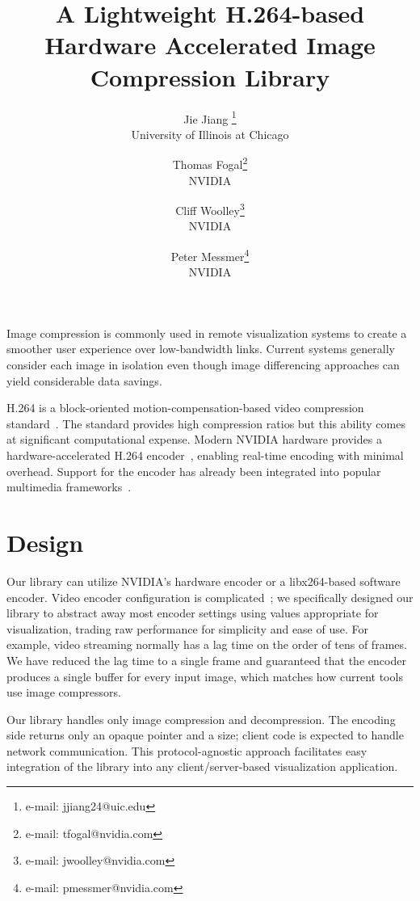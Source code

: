 \documentclass{vgtc}                          %
\title{A Lightweight H.264-based Hardware Accelerated Image Compression Library}
\author{Jie Jiang \thanks{e-mail: jjiang24@uic.edu}\\
        \scriptsize University of Illinois at Chicago
\and Thomas Fogal\thanks{e-mail: tfogal@nvidia.com}\\
     \scriptsize NVIDIA
\and Cliff Woolley\thanks{e-mail: jwoolley@nvidia.com}\\
     \scriptsize NVIDIA
\and Peter Messmer\thanks{e-mail: pmessmer@nvidia.com}\\
     \scriptsize NVIDIA}
\begin{document}


\maketitle

Image compression is commonly used in remote visualization systems to
create a smoother user experience over low-bandwidth links. Current
systems generally consider each image in isolation even though image
differencing approaches can yield considerable data savings.

H.264 is a block-oriented motion-compensation-based video compression
standard~\cite{wiegand2003overview}. The standard provides high
compression ratios but this ability comes at significant computational
expense.  Modern NVIDIA hardware provides a hardware-accelerated H.264
encoder~\cite{nvcodec}, enabling real-time encoding with
minimal overhead. Support for the encoder has already been
integrated into popular multimedia frameworks~\cite{ffmpeg}.

\section{Design}

Our library can utilize NVIDIA's hardware encoder or a libx264-based
software encoder. Video encoder configuration is
complicated~\cite{wiegand2003overview}; we specifically designed our
library to abstract away most encoder settings using values appropriate
for visualization, trading raw performance for simplicity and ease of
use.  For example, video streaming normally has a lag time on the order
of tens of frames. We have reduced the lag time to a single frame and
guaranteed that the encoder produces a single buffer for every input
image, which matches how current tools~\cite{Ayachit:2015:ParaView,
Childs:2011:VisIt} use image compressors.

Our library handles only image compression and decompression.  The
encoding side returns only an opaque pointer and a size; client code
is expected to handle network communication.  This protocol-agnostic
approach facilitates easy integration of the library into any
client/server-based visualization application.
\end{document}
